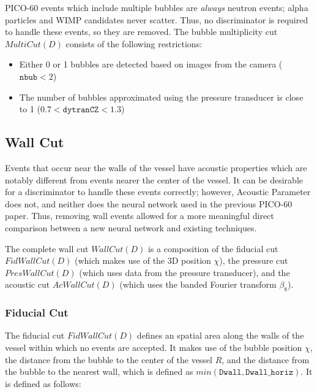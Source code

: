 \documentclass[10pt]{article}
\begin{document}
PICO-60 events which include multiple bubbles are \textit{always} neutron events; alpha particles and WIMP candidates never scatter. Thus, no discriminator is required to handle these events, so they are removed. The bubble multiplicity cut $MultiCut(D)$ consists of the following restrictions:

\begin{itemize}
    \item Either 0 or 1 bubbles are detected based on images from the camera ($\texttt{nbub}<2$)
    \item The number of bubbles approximated using the pressure transducer is close to 1 ($0.7<\texttt{dytranCZ}<1.3$)
\end{itemize}

\subsection{Wall Cut}

Events that occur near the walls of the vessel have acoustic properties which are notably different from events nearer the center of the vessel. It can be desirable for a discriminator to handle these events correctly; however, Acoustic Parameter does not, and neither does the neural network used in the previous PICO-60 paper. Thus, removing wall events allowed for a more meaningful direct comparison between a new neural network and existing techniques.

The complete wall cut $WallCut(D)$ is a composition of the fiducial cut $FidWallCut(D)$ (which makes use of the 3D position $\chi$), the pressure cut $PresWallCut(D)$ (which uses data from the pressure transducer), and the acoustic cut $AcWallCut(D)$ (which uses the banded Fourier transform $\beta _{8}$).

\subsubsection{Fiducial Cut}

The fiducial cut $FidWallCut(D)$ defines an spatial area along the walls of the vessel within which no events are accepted. It makes use of the bubble position $\chi$, the distance from the bubble to the center of the vessel $R$, and the distance from the bubble to the nearest wall, which is defined as $min(\texttt{Dwall}, \texttt{Dwall\_horiz})$. It is defined as follows:
\end{document}
